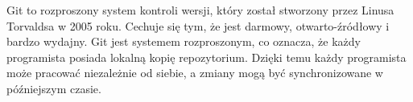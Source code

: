 Git to rozproszony system kontroli wersji, który został stworzony przez Linusa Torvaldsa w 2005 roku. Cechuje się tym, że jest darmowy, otwarto-źródłowy i bardzo wydajny. Git jest systemem rozproszonym, co oznacza, że każdy programista posiada lokalną kopię repozytorium. Dzięki temu każdy programista może pracować niezależnie od siebie, a zmiany mogą być synchronizowane w późniejszym czasie. \autocite{git}
